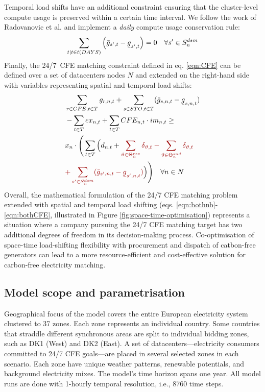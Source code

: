 Temporal load shifts have an additional constraint ensuring that the cluster-level compute usage is preserved within a certain time interval. We follow the work of Radovanovic et al. \cite{radovanovicIEEE2023} and implement a \textit{daily} compute usage conservation rule:
\begin{equation}
    \sum_{t | t \in t(DAYS)} \left(\bar{g}_{s',t} - \ubar{g}_{s',t}\right) = 0 \quad \forall {s'} \in S_n^{dsm}
    \label{eqn:dailyconserv2}
\end{equation}
Finally, the 24/7~CFE matching constraint defined in eq. \ref{eqn:CFE} can be defined over a set of datacenters nodes $N$ and extended on the right-hand side with variables representing spatial and temporal load shifts:
\begin{align}
    &\sum_{r\in CFE, t\in T} g_{r,n,t} + \sum_{s\in STO, t\in T} (\bar{g}_{s,n,t} - \ubar{g}_{s,n,t}) \nonumber \\
    &- \sum_{t\in T} ex_{n,t} + \sum_{t\in T} CFE_{n,t} \cdot im_{n,t} \geq \nonumber \\
    &x_n \cdot
        \Bigg( \sum_{t\in T} \Big( d_{n,t} + \textcolor{darkred}{\sum_{\vartheta \in \Theta_n^{rec}}\delta_{\vartheta, t} - \sum_{\vartheta \in \Theta_n^{snd}}\delta_{\vartheta, t}} \nonumber \\
        & \textcolor{darkred}{+ \sum_{{s'} \in S_n^{dsm}} (\bar{g}_{s',n,t} - \ubar{g}_{s',n,t})}\Big)\Bigg) \quad \forall n \in N\label{eqn:bothCFE}
\end{align}
Overall, the mathematical formulation of the 24/7 CFE matching problem extended with spatial and temporal load shifting (eqs. \ref{eqn:bothnb}-\ref{eqn:bothCFE}, illustrated in Figure \ref{fig:space-time-optimisation}) represents a situation where a company pursuing the 24/7 CFE matching target has two additional degrees of freedom in its decision-making process. Co-optimisation of space-time load-shifting flexibility with procurement and dispatch of catbon-free generators can lead to a more resource-efficient and cost-effective solution for carbon-free electricity matching.

\subsection{Model scope and parametrisation}

Geographical focus of the model covers the entire European electricity system clustered to 37 zones. Each zone represents an individual country. Some countries that straddle different synchronous areas are split to individual bidding zones, such as DK1 (West) and DK2 (East). A set of datacenters---electricity consumers committed to 24/7 CFE goals---are placed in several selected zones in each scenario. Each zone have unique weather patterns, renewable potentials, and background electricity mixes. The model's time horizon spans one year. All model runs are done with 1-hourly temporal resolution, i.e., 8760 time steps.

